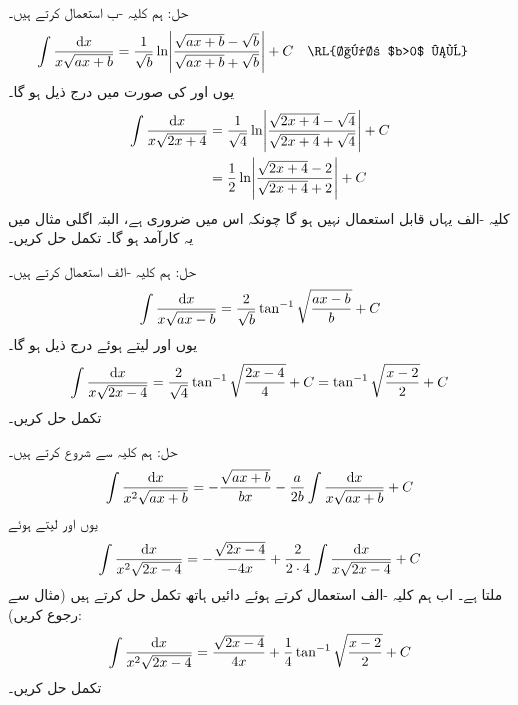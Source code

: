 حل:\quad
ہم کلیہ -ب استعمال کرتے ہیں۔
\begin{align*}
\int\frac{\dif x}{x\sqrt{ax+b}}&=\frac{1}{\sqrt{b}}\ln\abs{\frac{\sqrt{ax+b}-\sqrt{b}}{\sqrt{ax+b}+\sqrt{b}}}+C&&\text{\RL{اگر $b>0$ ہو}}
\end{align*}
یوں  اور  کی صورت میں درج ذیل ہو گا۔
\begin{align*}
\int\frac{\dif x}{x\sqrt{2x+4}}&=\frac{1}{\sqrt{4}}\ln\abs{\frac{\sqrt{2x+4}-\sqrt{4}}{\sqrt{2x+4}+\sqrt{4}}}+C\\
&=\frac{1}{2}\ln\abs{\frac{\sqrt{2x+4}-2}{\sqrt{2x+4}+2}}+C
\end{align*}
کلیہ -الف یہاں قابل استعمال نہیں ہو گا چونکہ اس میں  ضروری ہے، البتہ اگلی مثال میں یہ کارآمد ہو گا۔
تکمل  حل کریں۔

حل:\quad
ہم کلیہ -الف استعمال کرتے ہیں۔
\begin{align*}
\int\frac{\dif x}{x\sqrt{ax-b}}=\frac{2}{\sqrt{b}}\tan^{-1}\sqrt{\frac{ax-b}{b}}+C
\end{align*}
یوں  اور  لیتے ہوئے درج ذیل ہو گا۔
\begin{align*}
\int \frac{\dif x}{x\sqrt{2x-4}}=\frac{2}{\sqrt{4}}\tan^{-1}\sqrt{\frac{2x-4}{4}}+C=\tan^{-1}\sqrt{\frac{x-2}{2}}+C
\end{align*}
تکمل  حل کریں۔

حل:\quad
ہم کلیہ  سے شروع کرتے ہیں۔
\begin{align*}
\int\frac{\dif x}{x^2\sqrt{ax+b}}=-\frac{\sqrt{ax+b}}{bx}-\frac{a}{2b}\int\frac{\dif x}{x\sqrt{ax+b}}+C
\end{align*}
یوں  اور  لیتے ہوئے
\begin{align*}
\int\frac{\dif x}{x^2\sqrt{2x-4}}=-\frac{\sqrt{2x-4}}{-4x}+\frac{2}{2\cdot 4}\int\frac{\dif x}{x\sqrt{2x-4}}+C
\end{align*}
ملتا ہے۔ اب ہم کلیہ -الف استعمال کرتے ہوئے دائیں ہاتھ تکمل حل کرتے ہیں (مثال  سے رجوع کریں):
\begin{align*}
\int\frac{\dif x}{x^2\sqrt{2x-4}}=\frac{\sqrt{2x-4}}{4x}+\frac{1}{4}\tan^{-1}\sqrt{\frac{x-2}{2}}+C
\end{align*}
تکمل  حل کریں۔


